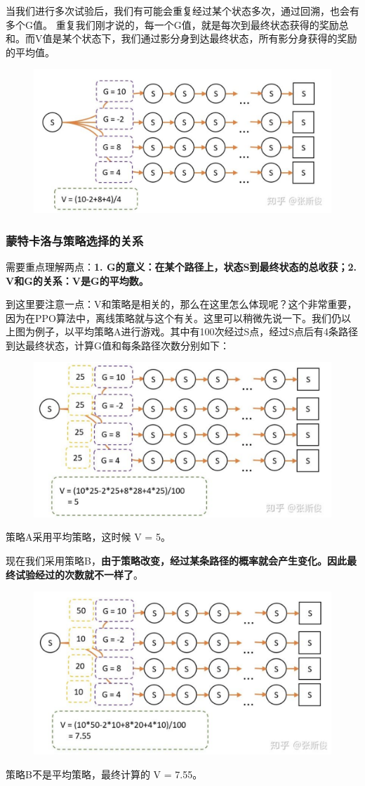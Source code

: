 \documentclass[12pt]{article}
\begin{document}
当我们进行多次试验后，我们有可能会重复经过某个状态多次，通过回溯，也会有多个G值。 重复我们刚才说的，每一个G值，就是每次到最终状态获得的奖励总和。而V值是某个状态下，我们通过影分身到达最终状态，所有影分身获得的奖励的平均值。
\begin{figure}[H]
    \centering
    \includegraphics[width=.6\textwidth]{fig/ReinforcementLearning/RL_G_Meaning_2.png}
\end{figure}

\subsubsection{蒙特卡洛与策略选择的关系}
需要重点理解两点：\textbf{1. G的意义：在某个路径上，状态S到最终状态的总收获；2. V和G的关系：V是G的平均数。}

到这里要注意一点：V和策略是相关的，那么在这里怎么体现呢？这个非常重要，因为在PPO算法中，离线策略就与这个有关。这里可以稍微先说一下。我们仍以上图为例子，以平均策略A进行游戏。其中有100次经过S点，经过S点后有4条路径到达最终状态，计算G值和每条路径次数分别如下：
\begin{figure}[H]
    \centering
    \includegraphics[width=.6\textwidth]{fig/ReinforcementLearning/RL_G_Meaning_3.png}
\end{figure}

策略A采用平均策略，这时候 V = 5。

现在我们采用策略B，\textbf{由于策略改变，经过某条路径的概率就会产生变化。因此最终试验经过的次数就不一样了}。
\begin{figure}[H]
    \centering
    \includegraphics[width=.6\textwidth]{fig/ReinforcementLearning/RL_G_Meaning_4.png}
\end{figure}
策略B不是平均策略，最终计算的 V = 7.55。
\end{document}
